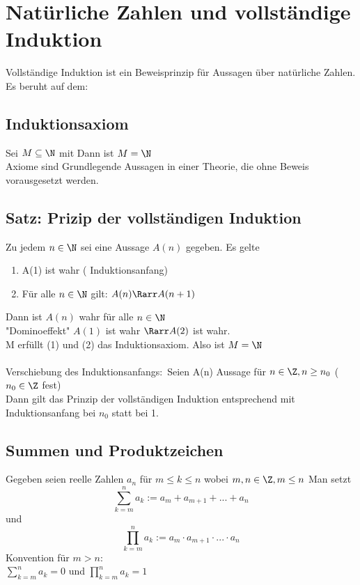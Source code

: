 \chapter{Natürliche Zahlen und vollständige Induktion}
Vollständige Induktion ist ein Beweisprinzip für Aussagen über natürliche Zahlen.\\
Es beruht auf dem:
\section{Induktionsaxiom}
Sei $M \subseteq \N$ mit
Dann ist $M = \N$\\
\bem Axiome sind Grundlegende Aussagen in einer Theorie, die ohne Beweis vorausgesetzt werden.
\section{Satz: Prizip der vollständigen Induktion}
Zu jedem $n \in \N$ sei eine Aussage $A(n)$ gegeben. Es gelte
\begin{enumerate}
\item {A(1) ist wahr ( {Induktionsanfang})}
\item Für alle $n \in \N$ gilt: $A(n) \Rarr A(n+1)$
\end{enumerate}
Dann ist $A(n)$ wahr für alle $n \in \N$\\
"Dominoeffekt" $A(1)$ ist wahr $\Rarr A(2)$ ist wahr.\\
M erfüllt (1) und (2) das Induktionsaxiom. Also ist $M = \N$\\
%
\\
%
Verschiebung des Induktionsanfangs:\
Seien A(n) Aussage für $n \in \Z, n \geq n_0$ ($n_0 \in \Z$ fest)\\
Dann gilt das Prinzip der vollständigen Induktion entsprechend mit Induktionsanfang bei $n_0$ statt bei 1.
\section*{Summen und Produktzeichen}
Gegeben seien reelle Zahlen $a_n$ für $m \leq k \leq n$ wobei $m,n \in \Z, m \leq n$ Man setzt 
$$\sum_{k=m}^{n} a_k := a_m + a_{m+1} + ... + a_{n} $$
und 
$$ \prod_{k = m}^{n} a_k := a_m \cdot a_{m+1} \cdot ... \cdot a_n $$
Konvention für $m > n$:\\
$\sum_{k=m}^{n} a_k = 0$
und
$\prod_{k=m}^{n} a_k = 1$
